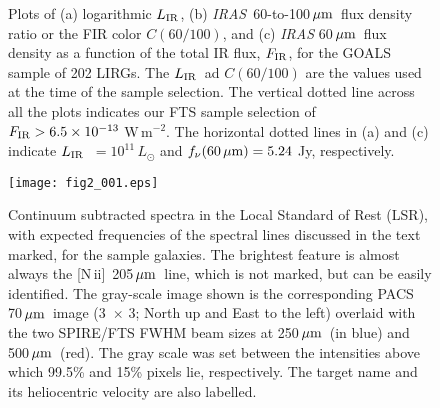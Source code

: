 \documentclass[preprint]{aastex}
\newcommand{\um}{\mbox{$\,\mu{\rm m}$}}
\newcommand{\IRAS}{{\it IRAS}}
\newcommand{\LIR}{\mbox{$L_{\rm IR}$}}
\newcommand{\NII}{\mbox{[N\,{\sc ii}]}}
\begin{document}

\begin{figure}[t]
\centering
\caption{
Plots of (a) logarithmic \LIR, (b) \IRAS\ 60-to-100\um\ flux density ratio or the FIR color
$C(60/100)$, and (c) {\it IRAS} 60\um\ flux density as a function of the total IR flux, 
$F_{\rm IR}$, for the GOALS sample of 202 LIRGs. The \LIR\ ad $C(60/100)$ are the values
used at the time of the sample selection.  The vertical dotted line across all the plots 
indicates our FTS sample selection of $F_{\rm IR} > 6.5 \times 10^{-13}$ W\,m$^{-2}$.  
The horizontal dotted lines in (a) and (c) indicate \LIR\ $= 10^{11}\,L_{\odot}$ and 
$f_{\nu}(60\um) = 5.24$ Jy, respectively.
}
\label{Fig1}
\end{figure}
\clearpage




\begin{figure}[t]
\centering
\texttt{[image: fig2\_001.eps]}
\caption{
Continuum subtracted spectra in the Local Standard of Rest (LSR), with expected frequencies of the spectral
lines discussed in the text marked, for the sample galaxies.  The brightest feature is almost always 
the \NII\ 205\um\ line, which is not marked, but can be easily identified.  The gray-scale image 
shown is the corresponding PACS 70\um\ image (3\arcmin\ $\times$ 3\arcmin; 
North up and East to the left) overlaid with the two SPIRE/FTS FWHM beam sizes at 250\um\ (in blue)
and 500\um\ (red). The gray scale was set between the intensities above which 99.5\% and 15\% pixels
lie, respectively.  The target name and its heliocentric velocity are also labelled. 
}
\label{Fig2}
\end{figure}
\clearpage
\end{document}
